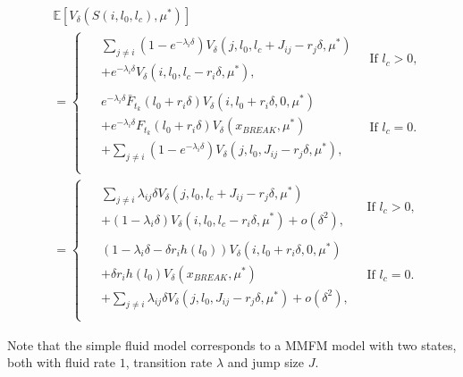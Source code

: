 \begin{equation}\label{eq:MmfmNextState}
\begin{split}
&\mathbb{E}[V_\delta(S(i,l_0,l_c),\mu^*)]\\
&=\begin{cases}
\begin{split}
&\sum\limits_{j\neq i}(1-e^{-\lambda_i \delta})V_\delta(j,l_0,l_c+J_{ij}-r_j\delta,\mu^*)\\
&+e^{-\lambda_i \delta}V_\delta(i,l_0,l_c-r_i\delta,\mu^*),
\end{split}&\ \text{If $l_c>0$,}\\
\begin{split}
&e^{-\lambda_i \delta} \bar{F}_{t_k}(l_0+r_i\delta)V_\delta(i,l_0+r_i\delta,0,\mu^*)\\
&+ e^{-\lambda_i \delta}F_{t_k}(l_0+r_i\delta)V_\delta(x_{BREAK},\mu^*)\\
&+\sum\limits_{j\neq i}(1-e^{-\lambda_i \delta})V_\delta(j,l_0,J_{ij}-r_j\delta,\mu^*),
\end{split}&\ \text{If $l_c=0$.}\\
\end{cases}\\
&=\begin{cases}
\begin{split}
&\sum\limits_{j\neq i}\lambda_{ij}\delta V_\delta(j,l_0,l_c+J_{ij}-r_j\delta,\mu^*)\\
&+(1-\lambda_i \delta)V_\delta(i,l_0,l_c-r_i\delta,\mu^*)+o(\delta^2),
\end{split}
&\ \text{If $l_c>0$,}\\
\begin{split}
&(1-\lambda_i \delta-\delta r_ih(l_0))V_\delta(i,l_0+r_i\delta,0,\mu^*)\\
&+ \delta r_ih(l_0)V_\delta(x_{BREAK},\mu^*)\\
&+\sum\limits_{j\neq i}\lambda_{ij} \delta V_\delta(j,l_0,J_{ij}-r_j\delta,\mu^*)+o(\delta^2),
\end{split}&\ \text{If $l_c=0$.}\\
\end{cases}
\end{split}
\end{equation}

\begin{remark}
	Note that the simple fluid model corresponds to a MMFM model with two states, both with fluid rate $1$, transition rate $\lambda$ and jump size $J$.
\end{remark}

